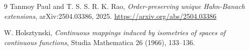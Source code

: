 \documentclass[11pt]{amsart}
\theoremstyle{definition}
\begin{document}
\begin{thebibliography}{9}
Tanmoy Paul and T. S. S. R. K. Rao,
\emph{Order-preserving unique Hahn-Banach extensions},
arXiv:2504.03386, 2025.
\url{https://arxiv.org/abs/2504.03386}

W. Holsztynski,
\emph{Continuous mappings induced by isometries of spaces of continuous functions},
Studia Mathematica 26 (1966), 133--136.
\end{thebibliography}
\end{document}
